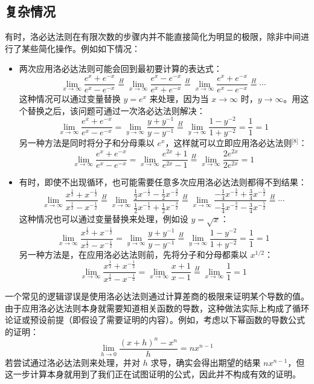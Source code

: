 \subsection{复杂情况}
有时，洛必达法则在有限次数的步骤内并不能直接简化为明显的极限，除非中间进行了某些简化操作。例如如下情况：
\begin{itemize}
\item 两次应用洛必达法则可能会回到最初要计算的表达式：
$$
\lim_{x \to \infty} \frac{e^x + e^{-x}}{e^x - e^{-x}} 
\stackrel{H}{=} 
\lim_{x \to \infty} \frac{e^x - e^{-x}}{e^x + e^{-x}} 
\stackrel{H}{=} 
\lim_{x \to \infty} \frac{e^x + e^{-x}}{e^x - e^{-x}} 
\stackrel{H}{=} \cdots~
$$
这种情况可以通过变量替换 $y = e^x$ 来处理，因为当 $x \to \infty$ 时，$y \to \infty$。用这个替换之后，该问题可通过一次洛必达法则解决：
$$
\lim_{x \to \infty} \frac{e^x + e^{-x}}{e^x - e^{-x}} 
= \lim_{y \to \infty} \frac{y + y^{-1}}{y - y^{-1}} 
\stackrel{H}{=} 
\lim_{y \to \infty} \frac{1 - y^{-2}}{1 + y^{-2}} 
= \frac{1}{1} = 1~
$$
另一种方法是同时将分子和分母乘以 $e^x$，这样就可以立即应用洛必达法则\(^\text{[8]}\)：
$$
\lim_{x \to \infty} \frac{e^x + e^{-x}}{e^x - e^{-x}} 
= \lim_{x \to \infty} \frac{e^{2x} + 1}{e^{2x} - 1} 
\stackrel{H}{=} 
\lim_{x \to \infty} \frac{2e^{2x}}{2e^{2x}} = 1~
$$
\item 有时，即使不出现循环，也可能需要任意多次应用洛必达法则都得不到结果：
$$
\lim_{x \to \infty} \frac{x^{\frac{1}{2}} + x^{-\frac{1}{2}}}{x^{\frac{1}{2}} - x^{-\frac{1}{2}}}
\stackrel{H}{=}
\lim_{x \to \infty} \frac{\frac{1}{2}x^{-\frac{1}{2}} - \frac{1}{2}x^{-\frac{3}{2}}}{\frac{1}{2}x^{-\frac{1}{2}} + \frac{1}{2}x^{-\frac{3}{2}}}
\stackrel{H}{=}
\lim_{x \to \infty} \frac{-\frac{1}{4}x^{-\frac{3}{2}} + \frac{3}{4}x^{-\frac{5}{2}}}{-\frac{1}{4}x^{-\frac{3}{2}} - \frac{3}{4}x^{-\frac{5}{2}}}
\stackrel{H}{=} \cdots~
$$
这种情况也可以通过变量替换来处理，例如设 $y = \sqrt{x}$：
$$
\lim_{x \to \infty} \frac{x^{\frac{1}{2}} + x^{-\frac{1}{2}}}{x^{\frac{1}{2}} - x^{-\frac{1}{2}}}
= \lim_{y \to \infty} \frac{y + y^{-1}}{y - y^{-1}}
\stackrel{H}{=}
\lim_{y \to \infty} \frac{1 - y^{-2}}{1 + y^{-2}} = \frac{1}{1} = 1~
$$
另一种方法是，在应用洛必达法则前，先将分子和分母都乘以 $x^{1/2}$：
$$
\lim_{x \to \infty} \frac{x^{\frac{1}{2}} + x^{-\frac{1}{2}}}{x^{\frac{1}{2}} - x^{-\frac{1}{2}}}
= \lim_{x \to \infty} \frac{x + 1}{x - 1}
\stackrel{H}{=}
\lim_{x \to \infty} \frac{1}{1} = 1~
$$
\end{itemize}
一个常见的逻辑谬误是使用洛必达法则通过计算差商的极限来证明某个导数的值。由于应用洛必达法则本身就需要知道相关函数的导数，这种做法实际上构成了循环论证或预设前提（即假设了需要证明的内容）。例如，考虑以下幂函数的导数公式的证明：
$$
\lim_{h \to 0} \frac{(x+h)^n - x^n}{h} = nx^{n-1}~
$$
若尝试通过洛必达法则来处理，并对 $h$ 求导，确实会得出期望的结果 $nx^{n-1}$，但这一步计算本身就用到了我们正在试图证明的公式，因此并不构成有效的证明。

